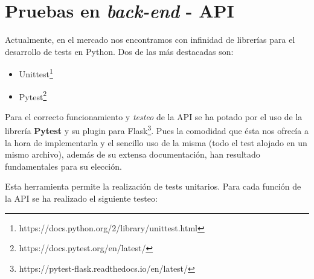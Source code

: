 \section{Pruebas en \textit{back-end} - API}

Actualmente, en el mercado nos encontramos con infinidad de librerías para el desarrollo de tests en Python. Dos de las más destacadas son:

\begin{itemize}
    \item Unittest\footnote{https://docs.python.org/2/library/unittest.html}
    \item Pytest\footnote{https://docs.pytest.org/en/latest/} 
\end{itemize}

Para el correcto funcionamiento y \textit{testeo} de la API se ha potado por el uso de la librería \textbf{Pytest} y su plugin para Flask\footnote{https://pytest-flask.readthedocs.io/en/latest/}. Pues la comodidad que ésta nos ofrecía a la hora de implementarla y el sencillo uso de la misma (todo el test alojado en un mismo archivo), además de su extensa documentación, han resultado fundamentales para su elección\cite{pytestvsunittest}.

Esta herramienta permite la realización de tests unitarios. Para cada función de la API se ha realizado el siguiente testeo:

